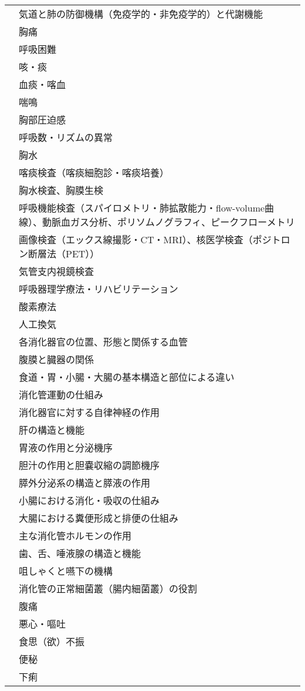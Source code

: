 \begin{xltabular}{\linewidth}{XX}
 & 気道と肺の防御機構（免疫学的・非免疫学的）と代謝機能 \\
 & 胸痛 \\
 & 呼吸困難 \\
 & 咳・痰 \\
 & 血痰・喀血 \\
 & 喘鳴 \\
 & 胸部圧迫感 \\
 & 呼吸数・リズムの異常 \\
 & 胸水 \\
 & 喀痰検査（喀痰細胞診・喀痰培養） \\
 & 胸水検査、胸膜生検 \\
 & 呼吸機能検査（スパイロメトリ・肺拡散能力・flow-volume曲線）、動脈血ガス分析、ポリソムノグラフィ、ピークフローメトリ \\
 & 画像検査（エックス線撮影・CT・MRI）、核医学検査（ポジトロン断層法（PET）） \\
 & 気管支内視鏡検査 \\
 & 呼吸器理学療法・リハビリテーション \\
 & 酸素療法 \\
 & 人工換気 \\
 & 各消化器官の位置、形態と関係する血管 \\
 & 腹膜と臓器の関係 \\
 & 食道・胃・小腸・大腸の基本構造と部位による違い \\
 & 消化管運動の仕組み \\
 & 消化器官に対する自律神経の作用 \\
 & 肝の構造と機能 \\
 & 胃液の作用と分泌機序 \\
 & 胆汁の作用と胆嚢収縮の調節機序 \\
 & 膵外分泌系の構造と膵液の作用 \\
 & 小腸における消化・吸収の仕組み \\
 & 大腸における糞便形成と排便の仕組み \\
 & 主な消化管ホルモンの作用 \\
 & 歯、舌、唾液腺の構造と機能 \\
 & 咀しゃくと嚥下の機構 \\
 & 消化管の正常細菌叢（腸内細菌叢）の役割 \\
 & 腹痛 \\
 & 悪心・嘔吐 \\
 & 食思（欲）不振 \\
 & 便秘 \\
 & 下痢 \\

\end{xltabular}
